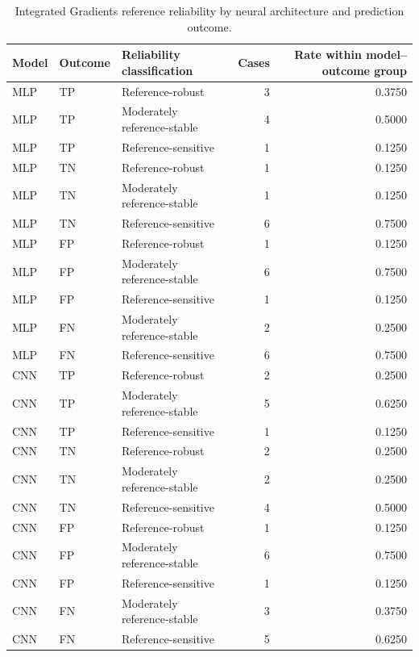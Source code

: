 \begin{table}
\caption{Integrated Gradients reference reliability by neural architecture and prediction outcome.}
\label{tab:ig_reliability_by_outcome}
\begin{tabular}{lllrr}
\toprule
Model & Outcome & Reliability classification & Cases & Rate within model–outcome group \\
\midrule
MLP & TP & Reference-robust & 3 & 0.3750 \\
MLP & TP & Moderately reference-stable & 4 & 0.5000 \\
MLP & TP & Reference-sensitive & 1 & 0.1250 \\
MLP & TN & Reference-robust & 1 & 0.1250 \\
MLP & TN & Moderately reference-stable & 1 & 0.1250 \\
MLP & TN & Reference-sensitive & 6 & 0.7500 \\
MLP & FP & Reference-robust & 1 & 0.1250 \\
MLP & FP & Moderately reference-stable & 6 & 0.7500 \\
MLP & FP & Reference-sensitive & 1 & 0.1250 \\
MLP & FN & Moderately reference-stable & 2 & 0.2500 \\
MLP & FN & Reference-sensitive & 6 & 0.7500 \\
CNN & TP & Reference-robust & 2 & 0.2500 \\
CNN & TP & Moderately reference-stable & 5 & 0.6250 \\
CNN & TP & Reference-sensitive & 1 & 0.1250 \\
CNN & TN & Reference-robust & 2 & 0.2500 \\
CNN & TN & Moderately reference-stable & 2 & 0.2500 \\
CNN & TN & Reference-sensitive & 4 & 0.5000 \\
CNN & FP & Reference-robust & 1 & 0.1250 \\
CNN & FP & Moderately reference-stable & 6 & 0.7500 \\
CNN & FP & Reference-sensitive & 1 & 0.1250 \\
CNN & FN & Moderately reference-stable & 3 & 0.3750 \\
CNN & FN & Reference-sensitive & 5 & 0.6250 \\
\bottomrule
\end{tabular}
\end{table}
